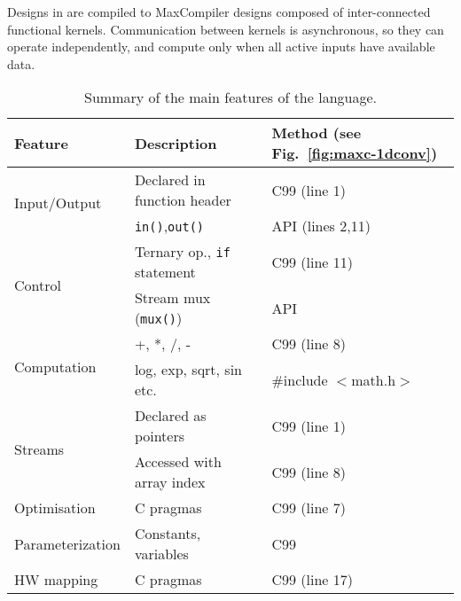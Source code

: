 Designs in \MAXC{} are compiled to MaxCompiler designs composed of
inter-connected functional kernels. Communication between kernels is
asynchronous, so they can operate independently, and compute only when
all active inputs have available data.

\begin{table}[!h]
  \centering
\renewcommand{\arraystretch}{1.2}
\caption{Summary of the main features of the \MAXC{} language.}
\label{table:maxc-features}
\begin{tabular}{l|l|l}
\hline
\bf{Feature}                   & \bf{Description}                   & \bf{Method (see Fig.~\ref{fig:maxc-1dconv})} \\
\hline\hline
  \multirow{2}{*}{Input/Output}         & Declared in function header          & C99 (line 1)                                 \\\cline{2-3}       & \texttt{in()},\texttt{out()}  & \MAXC{} API (lines 2,11) \\
\hline
  \multirow{2}{*}{Control}     & Ternary op., \texttt{if} statement & C99 (line 11)                                \\\cline{2-3}      & Stream mux (\texttt{mux()})       & \MAXC{} API  \\
\hline
\multirow{2}{*}{Computation} & +, *, /, -                         & C99 (line 8)                           \\\cline{2-3} & log, exp, sqrt, sin etc.  & \#include $<$math.h$>$  \\
\hline
  \multirow{2}{*}{Streams}     & Declared as pointers               & C99 (line 1)                                 \\\cline{2-3}       & Accessed with array index & C99 (line 8) \\
\hline
  Optimisation                 & C pragmas                   & C99 (line 7)                                 \\
\hline
  Parameterization             & Constants, variables                   & C99                                          \\
\hline
HW mapping                  & C pragmas                   & C99 (line 17)                                \\
\end{tabular}
\vspace{-0.4cm}
\end{table}


